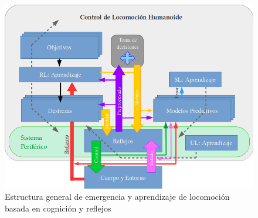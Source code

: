 \begin{figure}[!htb]
  \centering
  \includegraphics[width=1.0\textwidth]{images/ObjetivoGeneral.png}
  \caption{Estructura general de emergencia y aprendizaje de locomoci\'on basada en cognici\'on y reflejos}
  \label{fig:ObjGen}
\end{figure}


